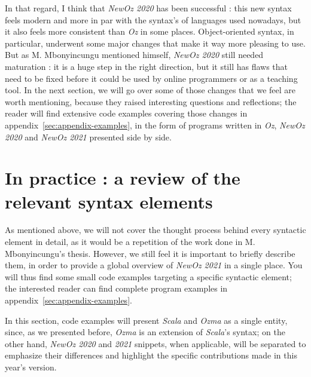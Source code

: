 In that regard, I think that \textit{NewOz 2020} has been successful : this new syntax feels modern and more in par with the syntax's of languages used nowadays, but it also feels more consistent than \textit{Oz} in some places.
Object-oriented syntax, in particular, underwent some major changes that make it way more pleasing to use.
But as M. Mbonyincungu mentioned himself, \textit{NewOz 2020} still needed maturation : it is a huge step in the right direction, but it still has flaws that need to be fixed before it could be used by online programmers or as a teaching tool.
In the next section, we will go over some of those changes that we feel are worth mentioning, because they raised interesting questions and reflections;
the reader will find extensive code examples covering those changes in appendix~\ref{sec:appendix-examples}, in the form of programs written in \textit{Oz}, \textit{NewOz 2020} and \textit{NewOz 2021} presented side by side.

\section{In practice : a review of the relevant syntax elements}\label{sec:ch2-review}
As mentioned above, we will not cover the thought process behind every syntactic element in detail, as it would be a repetition of the work done in M. Mbonyincungu's thesis.
However, we still feel it is important to briefly describe them, in order to provide a global overview of \textit{NewOz 2021} in a single place.\newline
You will thus find some small code examples targeting a specific syntactic element;
the interested reader can find complete program examples in appendix~\ref{sec:appendix-examples}.\newline

In this section, code examples will present \textit{Scala} and \textit{Ozma} as a single entity, since, as we presented before, \textit{Ozma} is an extension of \textit{Scala}'s syntax;
on the other hand, \textit{NewOz 2020} and \textit{2021} snippets, when applicable, will be separated to emphasize their differences and highlight the specific contributions made in this year's version.

